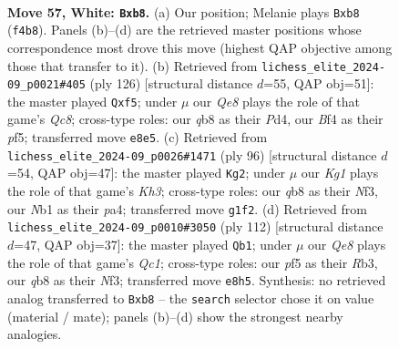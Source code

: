 \documentclass[11pt]{article}
\begin{document}
\clearpage

\begin{figure}[p]\centering
\begin{subfigure}{0.46\textwidth}\centering
\resizebox{\linewidth}{!}{%
\newchessgame
\chessboard[
  setfen={1qb1Q3/r7/8/p1kp1p2/P4B1P/8/8/RN4K1 w - - 4 57},
  showmover=false,
  pgfstyle=straightmove, color=movearrow, markmove={f4-b8}
]}
\caption{}
\end{subfigure}\hfill
\begin{subfigure}{0.46\textwidth}\centering
\resizebox{\linewidth}{!}{%
\newchessgame
\chessboard[
  setfen={2Q2bk1/5p2/7p/1p2Pp1P/3P4/8/q1B2K2/8 w - - 2 64},
  showmover=false,
  pgfstyle=straightmove, color=movearrow, markmove={c8-f5}
]}
\caption{}
\end{subfigure}
\\[4pt]
\begin{subfigure}{0.46\textwidth}\centering
\resizebox{\linewidth}{!}{%
\newchessgame
\chessboard[
  setfen={3q4/Q1b3k1/6p1/8/pP3r2/P4N1K/5P2/7R w - - 3 49},
  showmover=false,
  pgfstyle=straightmove, color=movearrow, markmove={h3-g2}
]}
\caption{}
\end{subfigure}\hfill
\begin{subfigure}{0.46\textwidth}\centering
\resizebox{\linewidth}{!}{%
\newchessgame
\chessboard[
  setfen={8/8/1P1p2pk/3P4/4qb2/1R3N1P/6P1/2Q4K w - - 3 57},
  showmover=false,
  pgfstyle=straightmove, color=movearrow, markmove={c1-b1}
]}
\caption{}
\end{subfigure}
\caption{\textbf{Move 57, White: \texttt{Bxb8}.} (a) Our position; Melanie plays \texttt{Bxb8} (\texttt{f4b8}). Panels (b)--(d) are the retrieved master positions whose correspondence most drove this move (highest QAP objective among those that transfer to it). (b) Retrieved from \texttt{lichess\_elite\_2024-09\_p0021\#405} (ply 126) [structural distance $d$=55, QAP obj=51]: the master played \texttt{Qxf5}; under $\mu$ our \emph{Qe8} plays the role of that game's \emph{Qc8}; cross-type roles: our \emph{q}b8 as their \emph{P}d4, our \emph{B}f4 as their \emph{p}f5; transferred move \texttt{e8e5}. (c) Retrieved from \texttt{lichess\_elite\_2024-09\_p0026\#1471} (ply 96) [structural distance $d$=54, QAP obj=47]: the master played \texttt{Kg2}; under $\mu$ our \emph{Kg1} plays the role of that game's \emph{Kh3}; cross-type roles: our \emph{q}b8 as their \emph{N}f3, our \emph{N}b1 as their \emph{p}a4; transferred move \texttt{g1f2}. (d) Retrieved from \texttt{lichess\_elite\_2024-09\_p0010\#3050} (ply 112) [structural distance $d$=47, QAP obj=37]: the master played \texttt{Qb1}; under $\mu$ our \emph{Qe8} plays the role of that game's \emph{Qc1}; cross-type roles: our \emph{p}f5 as their \emph{R}b3, our \emph{q}b8 as their \emph{N}f3; transferred move \texttt{e8h5}. Synthesis: no retrieved analog transferred to \texttt{Bxb8} -- the \texttt{search} selector chose it on value (material / mate); panels (b)--(d) show the strongest nearby analogies.}
\label{fig:thought-m112}
\end{figure}
\end{document}
